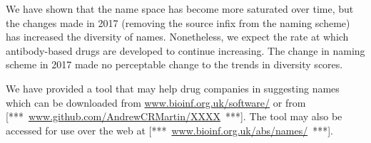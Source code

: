 \documentclass{article}
\newcommand{\note}[1]{\mbox{\color{red}[*** #1 ***]}}
\begin{document}
We have shown that the name space has become more saturated over time,
but the changes made in 2017 (removing the source infix from the
naming scheme) has increased the diversity of names. Nonetheless, we
expect the rate at which antibody-based drugs are developed to
continue increasing. The change in naming scheme in 2017 made no
perceptable change to the trends in diversity scores.

We have provided a tool that may help drug companies in suggesting
names which can be downloaded from \url{www.bioinf.org.uk/software/}
or from \note{\url{www.github.com/AndrewCRMartin/XXXX}}. The tool may also be
accessed for use over the web at \note{\url{www.bioinf.org.uk/abs/names/}}.



\end{document}
